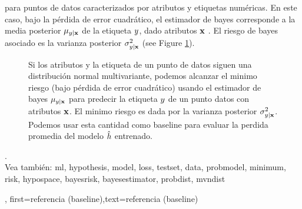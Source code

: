 {{para puntos de datos caracterizados por atributos y etiquetas numéricas.
En este caso, bajo la pérdida de error cuadrático, el estimador de bayes corresponde a la media posterior
$\mu_{y|{\bf x}}$ de la etiqueta $y$, dado  
atributos ${\bf x}$ \cite{LC,GrayProbBook}. El riesgo de bayes asociado es la 
varianza posterior
$\sigma^{2}_{y|{\bf x}}$ (see Figure \ref{fig_post_baseline_dict}).
	\begin{figure}[H]
		\begin{center}
		\end{center}
		\caption{Si los atributos y la etiqueta de un punto de datos siguen una distribución normal multivariante,  
		podemos alcanzar el minimo riesgo (bajo pérdida de error cuadrático) usando el estimador de bayes $\mu_{y|{\bf x}}$ 
		para predecir la etiqueta $y$ de un punto datos con atributos ${\bf x}$. El
		minimo riesgo es dada por la varianza posterior $\sigma^{2}_{y|{\bf x}}$. Podemos 
		usar esta cantidad como baseline para evaluar la perdida promedia del modelo $\hat{h}$ entrenado. \label{fig_post_baseline_dict}}
	\end{figure}
	.\\
		Vea también: \gls{ml},  \gls{hypothesis}, \gls{model}, \gls{loss}, \gls{testset}, \gls{data}, \gls{probmodel}, \gls{minimum},  \gls{risk}, \gls{hypospace}, \gls{bayesrisk}, \gls{bayesestimator}, \gls{probdist}, \gls{mvndist}   },
    first={referencia (baseline)},text={referencia (baseline)}
}

